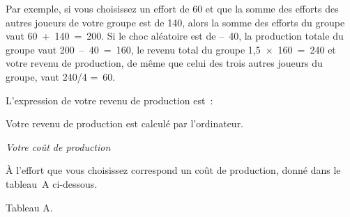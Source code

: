 \begin{Article}
\begin{refsection}[Lebourges]
\begin{appendices}
Par exemple, si vous choisissez un effort de 60 et que la somme des
efforts des autres joueurs de votre groupe est de 140, alors la somme
des efforts du groupe vaut 60~+~140~=~200. Si le choc aléatoire est de
--~40, la production totale du groupe vaut 200~--~40~=~160, le revenu
total du groupe 1,5~×~160~=~240 et votre revenu de production, de même
que celui des trois autres joueurs du groupe, vaut 240/4 =~60.

L'expression de votre revenu de production est~:
\begin{center}
\noindent{}
\end{center}

Votre revenu de production est calculé par l'ordinateur.
\vspace{0,2cm}

\emph{Votre coût de production}

\vspace{0,2cm}
À l'effort que vous choisissez correspond un coût de production, donné
dans le tableau~A ci-dessous.

\vspace{0,2cm}
{\centering Tableau A.\par}


\end{appendices}
\end{refsection}
\end{Article}
